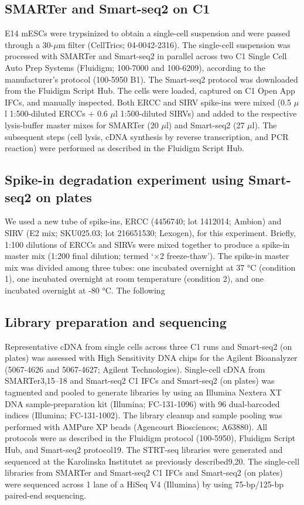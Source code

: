 \subsection{SMARTer and Smart-seq2 on C1}

E14 mESCs were trypsinized to obtain a single-cell suspension and were passed through a 30-\( \mu \)m filter (CellTrics; 04-0042-2316). The single-cell suspension was processed with SMARTer and Smart-seq2 in parallel across two C1 Single Cell Auto Prep Systems (Fluidigm; 100-7000 and 100-6209), according to the manufacturer’s protocol (100-5950 B1). The Smart-seq2 protocol was downloaded from the Fluidigm Script Hub. The cells were loaded, captured on C1 Open App IFCs, and manually inspected. Both ERCC and SIRV spike-ins were mixed (0.5 \( \mu \)l 1:500-diluted ERCCs + 0.6 \( \mu \)l 1:500-diluted SIRVs) and added to the respective lysis-buffer master mixes for SMARTer (20 \( \mu \)l) and Smart-seq2 (27 \( \mu \)l). The subsequent steps (cell lysis, cDNA synthesis by reverse transcription, and PCR reaction) were performed as described in the Fluidigm Script Hub.

\subsection{Spike-in degradation experiment using Smart-seq2 on plates}

We used a new tube of spike-ins, ERCC (4456740; lot 1412014; Ambion) and SIRV (E2 mix; SKU025.03; lot 216651530; Lexogen), for this experiment. Briefly, 1:100 dilutions of ERCCs and SIRVs were mixed together to produce a spike-in master mix (1:200 final dilution; termed ‘×2 freeze-thaw’). The spike-in master mix was divided among three tubes: one incubated overnight at 37 °C (condition 1), one incubated overnight at room temperature (condition 2), and one incubated overnight at -80 °C. The following

\subsection{Library preparation and sequencing}

Representative cDNA from single cells across three C1 runs and Smart-seq2 (on plates) was assessed with High Sensitivity DNA chips for the Agilent Bioanalyzer (5067-4626 and 5067-4627; Agilent Technologies). Single-cell cDNA from SMARTer3,15–18 and Smart-seq2 C1 IFCs and Smart-seq2 (on plates) was tagmented and pooled to generate libraries by using an Illumina Nextera XT DNA sample-preparation kit (Illumina; FC-131-1096) with 96 dual-barcoded indices (Illumina; FC-131-1002). The library cleanup and sample pooling was performed with AMPure XP beads (Agencourt Biosciences; A63880). All protocols were as described in the Fluidigm protocol (100-5950), Fluidigm Script Hub, and Smart-seq2 protocol19. The STRT-seq libraries were generated and sequenced at the Karolinska Institutet as previously described9,20. The single-cell libraries from SMARTer and Smart-seq2 C1 IFCs and Smart-seq2 (on plates) were sequenced across 1 lane of a HiSeq V4 (Illumina) by using 75-bp/125-bp paired-end sequencing.

